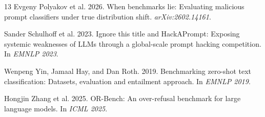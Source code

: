 \documentclass[11pt]{article}
\begin{document}
\begin{thebibliography}{13}
Evgeny Polyakov et al. 2026.
\newblock When benchmarks lie: Evaluating malicious prompt classifiers under true distribution shift.
\newblock \emph{arXiv:2602.14161}.

Sander Schulhoff et al. 2023.
\newblock Ignore this title and HackAPrompt: Exposing systemic weaknesses of LLMs through a global-scale prompt hacking competition.
\newblock In \emph{EMNLP 2023}.

Wenpeng Yin, Jamaal Hay, and Dan Roth. 2019.
\newblock Benchmarking zero-shot text classification: Datasets, evaluation and entailment approach.
\newblock In \emph{EMNLP 2019}.

Hongjin Zhang et al. 2025.
\newblock OR-Bench: An over-refusal benchmark for large language models.
\newblock In \emph{ICML 2025}.

\end{thebibliography}
\end{document}
